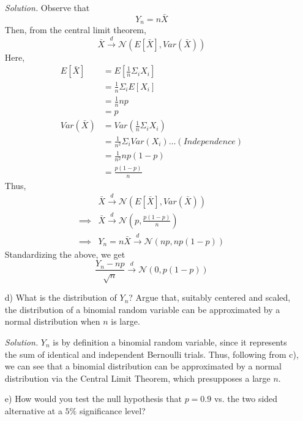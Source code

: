 \documentclass[
]{article}
\begin{document}
\begin{enumerate}
\textit{Solution.} Observe that 
\[Y_n = n \bar{X}\] 
Then, from the central limit theorem, 
\[\bar{X} \stackrel{d}{\to} \mathcal{N}(E[\bar{X}], Var(\bar{X}))\]
Here, 
\[\begin{aligned}
E[\bar{X}] &= E[\frac{1}{n}\Sigma_i X_i]  \\
&= \frac{1}{n} \Sigma_i E[X_i] \\
&= \frac{1}{n} np \\
&= p  \\
Var(\bar{X}) &= Var(\frac{1}{n}\Sigma_i X_i) \\
&= \frac{1}{n^2} \Sigma_i Var(X_i) \dots (Independence) \\
&= \frac{1}{n^2} n p(1-p) \\
&= \frac{p(1-p)}{n}
\end{aligned}\]
Thus, 
\[\begin{aligned}
&\bar{X} \stackrel{d}{\to} \mathcal{N}(E[\bar{X}], Var(\bar{X})) \\
\implies&\bar{X} \stackrel{d}{\to} \mathcal{N}(p, \frac{p(1-p)}{n})  \\
\implies& Y_n = n\bar{X} \stackrel{d}{\to} \mathcal{N}(np, np(1-p))
\end{aligned}\]
Standardizing the above, we get
\[\frac{Y_n - np}{\sqrt{n}} \stackrel{d}{\to} \mathcal{N}(0, p(1-p))\]  

\item[d)] What is the distribution of $Y_n$? Argue that, suitably centered and scaled, the distribution of a binomial random variable can be approximated by a normal distribution when $n$ is large.  
  
\textit{Solution.} $Y_n$ is by definition a binomial random variable, since it represents the sum of identical and independent Bernoulli trials. Thus, following from c), we can see that a binomial distribution can be approximated by a normal distribution via the Central Limit Theorem, which presupposes a large $n$.  

\item[e)] How would you test the null hypothesis that $p = 0.9$ vs. the two sided alternative at a $5\%$ significance level?  
  

\end{enumerate}
\end{document}

